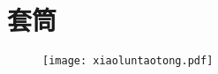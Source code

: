 \chapter{套筒}
\begin{figure}[htbp]
\centering
\texttt{[image: xiaoluntaotong.pdf]}
\end{figure}

\endinput